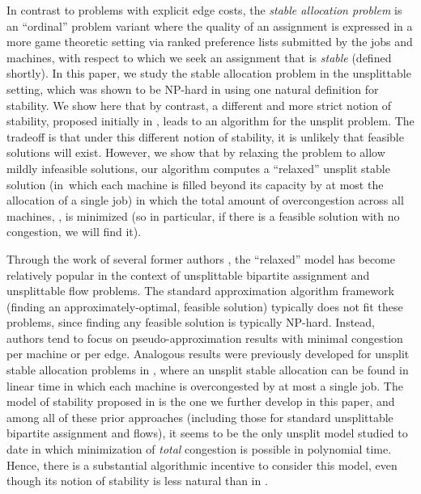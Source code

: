 \documentclass{llncs}
\begin{document}
In contrast to problems with explicit edge costs, the \emph{stable
  allocation problem} is an ``ordinal'' problem variant where the
quality of an assignment is expressed in a more game theoretic setting
via ranked preference lists submitted by the jobs and machines, with
respect to which we seek an assignment that is \emph{stable} (defined
shortly).  In this paper, we study the stable allocation problem in
the unsplittable setting, which was shown to be NP-hard in
\cite{DBLP:journals/jco/McDermidM10} using one natural definition for
stability.  We show here that by contrast, a different and more strict
notion of stability, proposed initially in \cite{dean_unsplit}, leads
to an  algorithm for the unsplit problem.  The tradeoff is
that under this different notion of stability, it is unlikely that
feasible solutions will exist.  However, we show that by relaxing the
problem to allow mildly infeasible solutions, our algorithm 
computes a ``relaxed'' unsplit stable solution (in~which each machine
is filled beyond its capacity by at most the allocation of a single
job) in which the total amount of overcongestion across all machines,
, is minimized (so
in particular, if there is a feasible solution with no congestion, we
will find it).

Through the work of several former authors
\cite{DinitzGG99,Skutella00,ShmoysT93}, the ``relaxed'' model has
become relatively popular in the context of unsplittable bipartite
assignment and unsplittable flow problems.  The standard approximation
algorithm framework (finding an approximately-optimal, feasible
solution) typically does not fit these problems, since finding any
feasible solution is typically NP-hard.  Instead, authors tend to
focus on pseudo-approximation results with minimal congestion per
machine or per edge.  Analogous results were previously developed for
unsplit stable allocation problems in \cite{dean_unsplit}, where an
unsplit stable allocation can be found in linear time in which each
machine is overcongested by at most a single job.  The model of
stability proposed in \cite{dean_unsplit} is the one we further
develop in this paper, and among all of these prior approaches
(including those for standard unsplittable bipartite assignment and
flows), it seems to be the only unsplit model studied to date in which
minimization of {\em total} congestion is possible in polynomial time.
Hence, there is a substantial algorithmic incentive to consider this
model, even though its notion of stability is less natural than in
\cite{DBLP:journals/jco/McDermidM10}.
\end{document}
